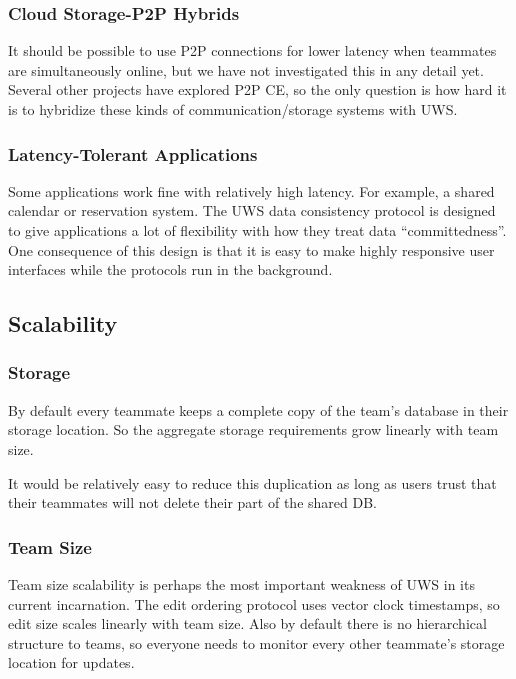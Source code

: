 \documentclass{article}
\begin{document}
\subsubsection{Cloud Storage-P2P Hybrids}

It should be possible to use P2P connections for lower latency when teammates are simultaneously online, but we have not investigated this in any detail yet.
Several other projects have explored P2P CE, so the only question is how hard it is to hybridize these kinds of communication/storage systems with UWS.

\subsubsection{Latency-Tolerant Applications}

Some applications work fine with relatively high latency.
For example, a shared calendar or reservation system.
The UWS data consistency protocol is designed to give applications a lot of flexibility with how they treat data ``committedness''.
One consequence of this design is that it is easy to make highly responsive user interfaces while the protocols run in the background.

\subsection{Scalability}

\subsubsection{Storage}

By default every teammate keeps a complete copy of the team's database in their storage location.
So the aggregate storage requirements grow linearly with team size.

It would be relatively easy to reduce this duplication as long as users trust that their teammates will not delete their part of the shared DB.

\subsubsection{Team Size}

Team size scalability is perhaps the most important weakness of UWS in its current incarnation.
The edit ordering protocol uses vector clock timestamps, so edit size scales linearly with team size.
Also by default there is no hierarchical structure to teams, so everyone needs to monitor every other teammate's storage location for updates.
\end{document}
